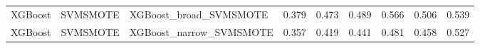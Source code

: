 \begin{tabular}{lllllllll}
                     XGBoost &            SVMSMOTE &                       XGBoost\_broad\_SVMSMOTE & 0.379 &                     0.473 &                 0.489 &                  0.566 &                                   0.506 &    0.539 \\
                     XGBoost &            SVMSMOTE &                      XGBoost\_narrow\_SVMSMOTE & 0.357 &                     0.419 &                 0.441 &                  0.481 &                                   0.458 &    0.527 \\
\bottomrule
\end{tabular}
